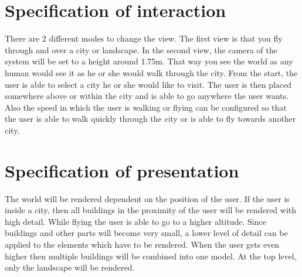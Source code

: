 \section{Specification of interaction}
\label{sec:SpecificationOfInteraction}
There are 2 different modes to change the view. The first view is that you fly through and over a city or landscape. In the second view, the camera of the system will be set to a height around 1.75m. That way you see the world as any human would see it as he or she would walk through the city. From the start, the user is able to select a city he or she would like to visit. The user is then placed somewhere above or within the city and is able to go anywhere the user wants. Also the speed in which the user is walking or flying can be configured so that the user is able to walk quickly through the city or is able to fly towards another city.

\section{Specification of presentation}
\label{sec:SpecificationOfPresentation}
The world will be rendered dependent on the position of the user. If the user is inside a city, then all buildings in the proximity of the user will be rendered with high detail. While flying the user is able to go to a higher altitude. Since buildings and other parts will become very small, a lower level of detail can be applied to the elements which have to be rendered. When the user gets even higher then multiple buildings will be combined into one model. At the top level, only the landscape will be rendered.